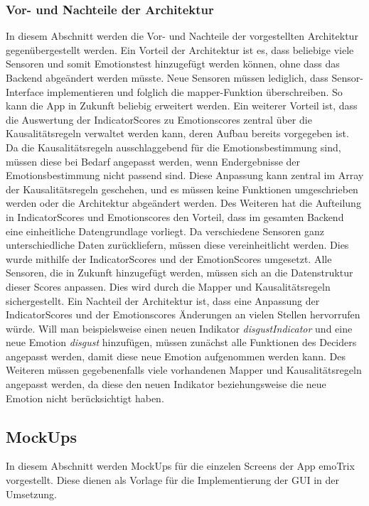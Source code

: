 \subsubsection{Vor- und Nachteile der Architektur} 
In diesem Abschnitt werden die Vor- und Nachteile der vorgestellten Architektur gegenübergestellt werden. \newline
Ein Vorteil der Architektur ist es, dass beliebige viele Sensoren und somit Emotionstest hinzugefügt werden können, ohne dass das Backend abgeändert werden müsste. Neue Sensoren müssen lediglich, dass Sensor-Interface implementieren und folglich die mapper-Funktion überschreiben. So kann die App in Zukunft beliebig erweitert werden. \newline
Ein weiterer Vorteil ist, dass die Auswertung der IndicatorScores zu Emotionscores zentral über die Kausalitätsregeln verwaltet werden kann, deren Aufbau bereits vorgegeben ist. Da die Kausalitätsregeln ausschlaggebend für die Emotionsbestimmung sind, müssen diese bei Bedarf angepasst werden, wenn Endergebnisse der Emotionsbestimmung nicht passend sind. Diese Anpassung kann zentral im Array der Kausalitätsregeln geschehen, und es müssen keine Funktionen umgeschrieben werden oder die Architektur abgeändert werden. \newline
Des Weiteren hat die Aufteilung in IndicatorScores und Emotionscores den Vorteil, dass im gesamten Backend eine einheitliche Datengrundlage vorliegt. Da verschiedene Sensoren ganz unterschiedliche Daten zurückliefern, müssen diese vereinheitlicht werden. Dies wurde mithilfe der IndicatorScores und der EmotionScores umgesetzt. Alle Sensoren, die in Zukunft hinzugefügt werden, müssen sich an die Datenstruktur dieser Scores anpassen. Dies wird durch die Mapper und Kausalitätsregeln sichergestellt. \newline
\newline
Ein Nachteil der Architektur ist, dass eine Anpassung der IndicatorScores und der Emotionscores Änderungen an vielen Stellen hervorrufen würde. Will man beispielsweise einen neuen Indikator \textit{disgustIndicator} und eine neue Emotion \textit{disgust} hinzufügen, müssen zunächst alle Funktionen des Deciders angepasst werden, damit diese neue Emotion aufgenommen werden kann. Des Weiteren müssen gegebenenfalls viele vorhandenen Mapper und Kausalitätsregeln angepasst werden, da diese den neuen Indikator beziehungsweise die neue Emotion nicht berücksichtigt haben.
\subsection{MockUps}
In diesem Abschnitt werden MockUps für die einzelen Screens der App emoTrix vorgestellt. Diese dienen als Vorlage für die Implementierung der GUI in der Umsetzung.
